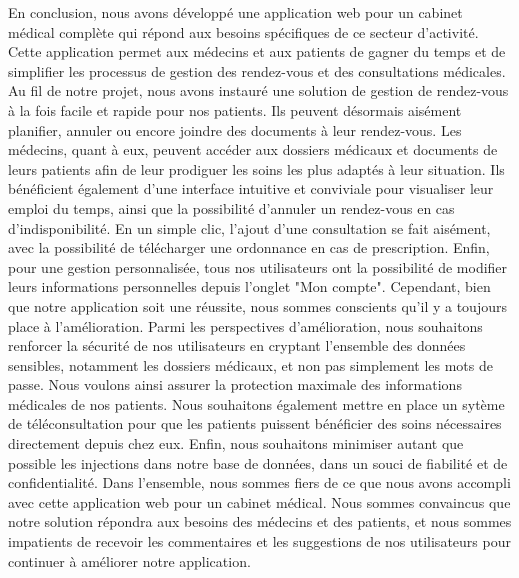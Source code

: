 \documentclass[a4paper]{report}
\begin{document}
En conclusion, nous avons développé une application web pour un cabinet médical complète qui répond aux besoins spécifiques de ce secteur d'activité. Cette application permet aux 
médecins et aux patients de gagner du temps et de simplifier les processus de gestion des rendez-vous et des consultations 
médicales. \newline\newline
Au fil de notre projet, nous avons instauré une solution de gestion de rendez-vous à la fois facile et rapide pour nos patients. 
Ils peuvent désormais aisément planifier, annuler ou encore joindre des documents à leur rendez-vous. Les médecins, quant à eux, 
peuvent accéder aux dossiers médicaux et documents de leurs patients afin de leur prodiguer les soins les plus adaptés à leur situation. 
Ils bénéficient également d'une interface intuitive et conviviale pour visualiser leur emploi du temps, ainsi que la possibilité d'annuler un 
rendez-vous en cas d'indisponibilité. En un simple clic, l'ajout d'une consultation se fait aisément, avec la possibilité de télécharger une ordonnance 
en cas de prescription. Enfin, pour une gestion personnalisée, tous nos utilisateurs ont la possibilité de modifier leurs informations personnelles depuis 
l'onglet "Mon compte".\newline\newline
Cependant, bien que notre application soit une réussite, nous sommes conscients qu'il y a toujours place à l'amélioration. 
Parmi les perspectives d'amélioration, nous souhaitons renforcer la sécurité de nos utilisateurs en cryptant l'ensemble des données 
sensibles, notamment les dossiers médicaux, et non pas simplement les mots de passe. Nous voulons ainsi assurer la protection maximale 
des informations médicales de nos patients. 
Nous souhaitons également mettre en place un sytème de téléconsultation pour que les patients puissent bénéficier 
des soins nécessaires directement depuis chez eux. Enfin, nous souhaitons minimiser autant que possible les injections dans notre base de données, 
dans un souci de fiabilité et de confidentialité. \newline\newline
Dans l'ensemble, nous sommes fiers de ce que nous avons accompli avec cette application web pour un cabinet médical. Nous sommes 
convaincus que notre solution répondra aux besoins des médecins et des patients, et nous sommes impatients de recevoir les commentaires 
et les suggestions de nos utilisateurs pour continuer à améliorer notre application.
\end{document}
